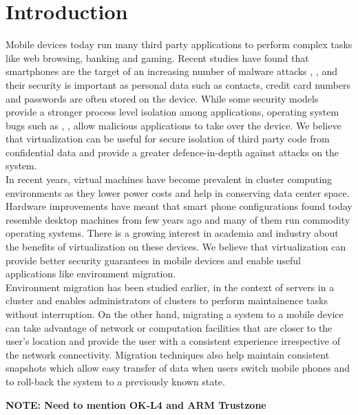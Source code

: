 \section{Introduction}
Mobile devices today run many third party applications to perform complex tasks like web browsing, banking and gaming. Recent studies have found that smartphones are the target of an increasing number of malware attacks \cite{bose2006mobile},  \cite{cybercriminals2007banks},  \cite{iphone2010seriot} and their security is important as personal data such as contacts, credit card numbers and passwords are often stored on the device. While some security models \cite{androidsecurity} provide a stronger process level isolation among applications, operating system bugs such as \cite{kernel2009vulnerability}, \cite{opencore2009android}, \cite{sms2009iphone} allow malicious applications to take over the device. We believe that virtualization can be useful for secure isolation of third party code from confidential data and provide a greater defence-in-depth against attacks on the system.\\

In recent years, virtual machines have become prevalent in cluster computing environments \cite{gartner2009virtual} as they lower power costs and help in conserving data center space. Hardware improvements have meant that smart phone configurations found today resemble desktop machines from few years ago and many of them run commodity operating systems. There is a growing interest in academia \cite{cox2007pocket} and industry \cite{vmware2009nextfrontier} about the benefits of virtualization on these devices. We believe that virtualization can provide better security guarantees in mobile devices and enable useful applications like environment migration. \\

Environment migration has been studied earlier, in the context of servers in a cluster \cite{clark2005live} and enables administrators of clusters to perform maintainence tasks without interruption. On the other hand, migrating a system to a mobile device can take advantage of network or computation facilities that are closer to the user's location and provide the user with a consistent experience irrespective of the network connectivity. Migration techniques also help maintain consistent snapshots which allow easy transfer of data when users switch mobile phones and to roll-back the system to a previously known state.

{\bf NOTE: Need to mention OK-L4 and  ARM Trustzone \newline}
